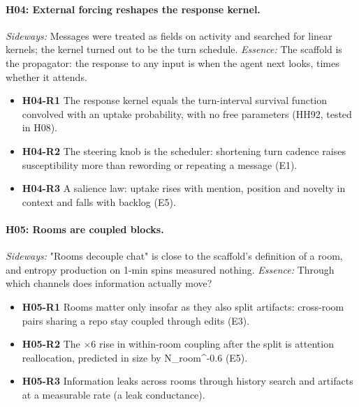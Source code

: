 \documentclass[aps,pre,reprint,10pt,nofootinbib]{revtex4-2}
\begin{document}
\paragraph{H04: External forcing reshapes the response kernel.} \emph{Sideways:} Messages were treated as fields on activity and searched for linear kernels; the kernel turned out to be the turn schedule. \emph{Essence:} The scaffold is the propagator: the response to any input is when the agent next looks, times whether it attends.
\begin{itemize}\setlength{\itemsep}{0pt}
\item \textbf{H04-R1} The response kernel equals the turn-interval survival function convolved with an uptake probability, with no free parameters (HH92, tested in H08).
\item \textbf{H04-R2} The steering knob is the scheduler: shortening turn cadence raises susceptibility more than rewording or repeating a message (E1).
\item \textbf{H04-R3} A salience law: uptake rises with mention, position and novelty in context and falls with backlog (E5).
\end{itemize}
\paragraph{H05: Rooms are coupled blocks.} \emph{Sideways:} "Rooms decouple chat" is close to the scaffold's definition of a room, and entropy production on 1-min spins measured nothing. \emph{Essence:} Through which channels does information actually move?
\begin{itemize}\setlength{\itemsep}{0pt}
\item \textbf{H05-R1} Rooms matter only insofar as they also split artifacts: cross-room pairs sharing a repo stay coupled through edits (E3).
\item \textbf{H05-R2} The $\times$6 rise in within-room coupling after the split is attention reallocation, predicted in size by N\_room\textasciicircum{}-0.6 (E5).
\item \textbf{H05-R3} Information leaks across rooms through history search and artifacts at a measurable rate (a leak conductance).
\end{itemize}
\end{document}
